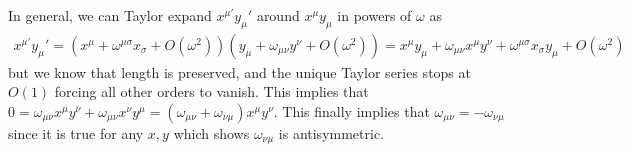 \documentclass[10pt, a4paper]{article}
\begin{document}
\begin{enumerate}
  In general, we can Taylor expand $x^{\mu'} y_\mu'$ around $x^\mu y_\mu$ in powers of $\omega$ as 
  \begin{align*}
    x^{\mu'} y_\mu' = (x^\mu + \omega^{\mu \sigma} x_{\sigma} + O(\omega^2))(y_\mu + \omega_{\mu \nu} y^{\nu} + O(\omega^2)) = x^\mu y_\mu + \omega_{\mu \nu}x^{\mu}y^{\nu} + \omega^{\mu \sigma}x_{\sigma} y_{\mu} + O(\omega^2 )
  \end{align*}
  but we know that length is preserved, and the unique Taylor series stops at $O(1)$ forcing all other orders to vanish. This implies that  $0 = \omega_{\mu \nu}x^{\mu}y^{\nu} + \omega_{\mu \nu}x^{\nu} y^{\mu} = (\omega_{\mu \nu} + \omega_{\nu \mu})x^{\mu}y^{\nu}$. This finally implies that $\omega_{\mu \nu} = - \omega_{\nu \mu}$ since it is true for any $x, y$ which shows $\omega_{\nu \mu}$ is antisymmetric. 


\end{enumerate}
\end{document}
